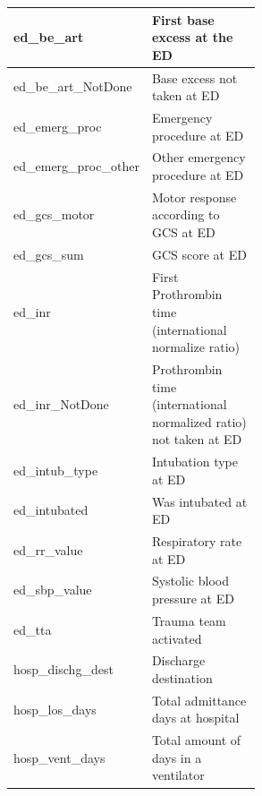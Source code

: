 \documentclass[12pt, a4paper]{article}
\begin{document}
\begin{appendices}
\begin{longtable}[c]{@{}|l|p{0.55\linewidth}|@{}}
        ed\_be\_art                                 & First base excess at the ED                                       \\\hline
        ed\_be\_art\_NotDone                        & Base excess not taken at ED                                       \\\hline
        ed\_emerg\_proc                             & Emergency procedure at ED                                         \\\hline
        ed\_emerg\_proc\_other                      & Other emergency procedure at ED                                   \\\hline
        ed\_gcs\_motor                              & Motor response according to GCS at ED                             \\\hline
        ed\_gcs\_sum                                & GCS score at ED                                                   \\\hline
        ed\_inr                                     & First Prothrombin time (international normalize ratio)            \\\hline
        ed\_inr\_NotDone                            & Prothrombin time (international normalized ratio) not taken at ED \\\hline
        ed\_intub\_type                             & Intubation type at ED                                             \\\hline
        ed\_intubated                               & Was intubated at ED                                               \\\hline
        ed\_rr\_value                               & Respiratory rate at ED                                            \\\hline
        ed\_sbp\_value                              & Systolic blood pressure at ED                                     \\\hline
        ed\_tta                                     & Trauma team activated                                             \\\hline
        hosp\_dischg\_dest                          & Discharge destination                                             \\\hline
        hosp\_los\_days                             & Total admittance days at hospital                                 \\\hline
        hosp\_vent\_days                            & Total amount of days in a ventilator                              \\\hline

\end{longtable}
\end{appendices}
\end{document}
